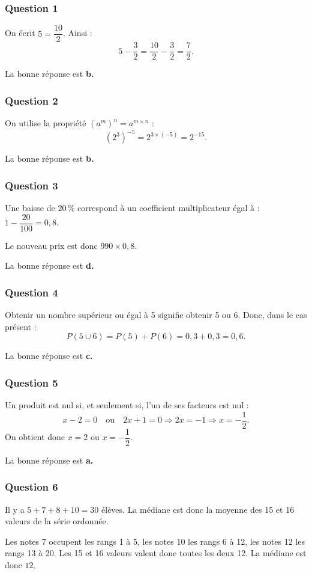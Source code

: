 \subsubsection*{Question 1}
On écrit $5=\dfrac{10}{2}$. Ainsi :
\[5-\dfrac{3}{2}=\dfrac{10}{2}-\dfrac{3}{2}=\dfrac{7}{2}.\]

La bonne réponse est \textbf{b.}

\subsubsection*{Question 2}
On utilise la propriété $(a^m)^n=a^{m \times n}$ :
\[\left(2^3\right)^{-5}=2^{3\times(-5)}=2^{-15}.\]

La bonne réponse est \textbf{b.}

\subsubsection*{Question 3}
Une baisse de $20\,\%$ correspond à un coefficient multiplicateur égal à : $1-\dfrac{20}{100}=0{,}8$.

Le nouveau prix est donc $990\times 0{,}8$.

La bonne réponse est \textbf{d.}

\subsubsection*{Question 4}
Obtenir un nombre supérieur ou égal à 5 signifie obtenir 5 ou 6. Donc, dans le cas présent :
\[P(5 \cup 6)=P(5)+P(6)=0{,}3+0{,}3=0{,}6.\]

La bonne réponse est \textbf{c.}

\subsubsection*{Question 5}
Un produit est nul si, et seulement si, l'un de ses facteurs est nul :
\[x-2=0 \quad \text{ou} \quad 2x+1=0 \Rightarrow 2x=-1 \Rightarrow x=-\dfrac{1}{2}.\]
On obtient donc $x=2$ ou $x=-\dfrac{1}{2}$.

La bonne réponse est \textbf{a.}

\subsubsection*{Question 6}
Il y a $5+7+8+10=30$ élèves. La médiane est donc la moyenne des 15\ieme{} et 16\ieme{} valeurs de la série ordonnée.

Les notes 7 occupent les rangs 1 à 5, les notes 10 les rangs 6 à 12, les notes 12 les rangs 13 à 20. Les 15\ieme{} et 16\ieme{} valeurs valent donc toutes les deux 12. La médiane est donc $12$.

